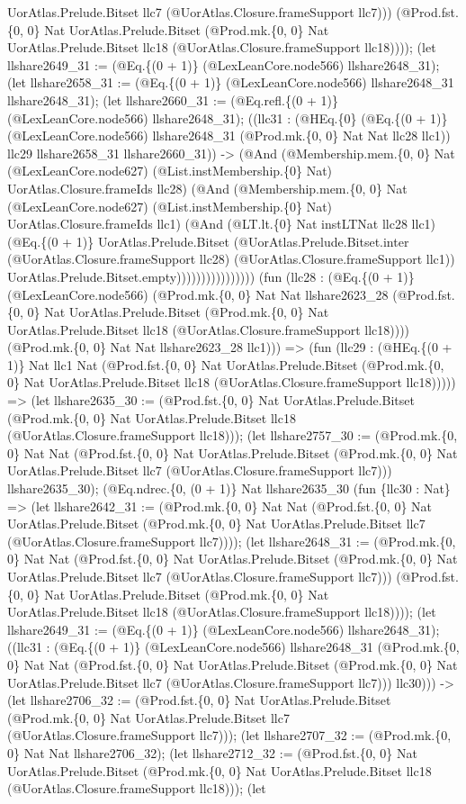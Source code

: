 \documentclass[11pt]{article}
\begin{document}
UorAtlas.Prelude.Bitset llc7 (@UorAtlas.Closure.frameSupport llc7))) (@Prod.fst.\{0, 0\} Nat UorAtlas.Prelude.Bitset (@Prod.mk.\{0, 0\} Nat UorAtlas.Prelude.Bitset llc18 (@UorAtlas.Closure.frameSupport llc18)))); (let llshare2649\_31 := (@Eq.\{(0 + 1)\} (@LexLeanCore.node566) llshare2648\_31); (let llshare2658\_31 := (@Eq.\{(0 + 1)\} (@LexLeanCore.node566) llshare2648\_31 llshare2648\_31); (let llshare2660\_31 := (@Eq.refl.\{(0 + 1)\} (@LexLeanCore.node566) llshare2648\_31); ((llc31 : (@HEq.\{0\} (@Eq.\{(0 + 1)\} (@LexLeanCore.node566) llshare2648\_31 (@Prod.mk.\{0, 0\} Nat Nat llc28 llc1)) llc29 llshare2658\_31 llshare2660\_31)) -> (@And (@Membership.mem.\{0, 0\} Nat (@LexLeanCore.node627) (@List.instMembership.\{0\} Nat) UorAtlas.Closure.frameIds llc28) (@And (@Membership.mem.\{0, 0\} Nat (@LexLeanCore.node627) (@List.instMembership.\{0\} Nat) UorAtlas.Closure.frameIds llc1) (@And (@LT.lt.\{0\} Nat instLTNat llc28 llc1) (@Eq.\{(0 + 1)\} UorAtlas.Prelude.Bitset (@UorAtlas.Prelude.Bitset.inter (@UorAtlas.Closure.frameSupport llc28) (@UorAtlas.Closure.frameSupport llc1)) UorAtlas.Prelude.Bitset.empty)))))))))))))))) (fun (llc28 : (@Eq.\{(0 + 1)\} (@LexLeanCore.node566) (@Prod.mk.\{0, 0\} Nat Nat llshare2623\_28 (@Prod.fst.\{0, 0\} Nat UorAtlas.Prelude.Bitset (@Prod.mk.\{0, 0\} Nat UorAtlas.Prelude.Bitset llc18 (@UorAtlas.Closure.frameSupport llc18)))) (@Prod.mk.\{0, 0\} Nat Nat llshare2623\_28 llc1))) => (fun (llc29 : (@HEq.\{(0 + 1)\} Nat llc1 Nat (@Prod.fst.\{0, 0\} Nat UorAtlas.Prelude.Bitset (@Prod.mk.\{0, 0\} Nat UorAtlas.Prelude.Bitset llc18 (@UorAtlas.Closure.frameSupport llc18))))) => (let llshare2635\_30 := (@Prod.fst.\{0, 0\} Nat UorAtlas.Prelude.Bitset (@Prod.mk.\{0, 0\} Nat UorAtlas.Prelude.Bitset llc18 (@UorAtlas.Closure.frameSupport llc18))); (let llshare2757\_30 := (@Prod.mk.\{0, 0\} Nat Nat (@Prod.fst.\{0, 0\} Nat UorAtlas.Prelude.Bitset (@Prod.mk.\{0, 0\} Nat UorAtlas.Prelude.Bitset llc7 (@UorAtlas.Closure.frameSupport llc7))) llshare2635\_30); (@Eq.ndrec.\{0, (0 + 1)\} Nat llshare2635\_30 (fun \{llc30 : Nat\} => (let llshare2642\_31 := (@Prod.mk.\{0, 0\} Nat Nat (@Prod.fst.\{0, 0\} Nat UorAtlas.Prelude.Bitset (@Prod.mk.\{0, 0\} Nat UorAtlas.Prelude.Bitset llc7 (@UorAtlas.Closure.frameSupport llc7)))); (let llshare2648\_31 := (@Prod.mk.\{0, 0\} Nat Nat (@Prod.fst.\{0, 0\} Nat UorAtlas.Prelude.Bitset (@Prod.mk.\{0, 0\} Nat UorAtlas.Prelude.Bitset llc7 (@UorAtlas.Closure.frameSupport llc7))) (@Prod.fst.\{0, 0\} Nat UorAtlas.Prelude.Bitset (@Prod.mk.\{0, 0\} Nat UorAtlas.Prelude.Bitset llc18 (@UorAtlas.Closure.frameSupport llc18)))); (let llshare2649\_31 := (@Eq.\{(0 + 1)\} (@LexLeanCore.node566) llshare2648\_31); ((llc31 : (@Eq.\{(0 + 1)\} (@LexLeanCore.node566) llshare2648\_31 (@Prod.mk.\{0, 0\} Nat Nat (@Prod.fst.\{0, 0\} Nat UorAtlas.Prelude.Bitset (@Prod.mk.\{0, 0\} Nat UorAtlas.Prelude.Bitset llc7 (@UorAtlas.Closure.frameSupport llc7))) llc30))) -> (let llshare2706\_32 := (@Prod.fst.\{0, 0\} Nat UorAtlas.Prelude.Bitset (@Prod.mk.\{0, 0\} Nat UorAtlas.Prelude.Bitset llc7 (@UorAtlas.Closure.frameSupport llc7))); (let llshare2707\_32 := (@Prod.mk.\{0, 0\} Nat Nat llshare2706\_32); (let llshare2712\_32 := (@Prod.fst.\{0, 0\} Nat UorAtlas.Prelude.Bitset (@Prod.mk.\{0, 0\} Nat UorAtlas.Prelude.Bitset llc18 (@UorAtlas.Closure.frameSupport llc18))); (let 
\end{document}
